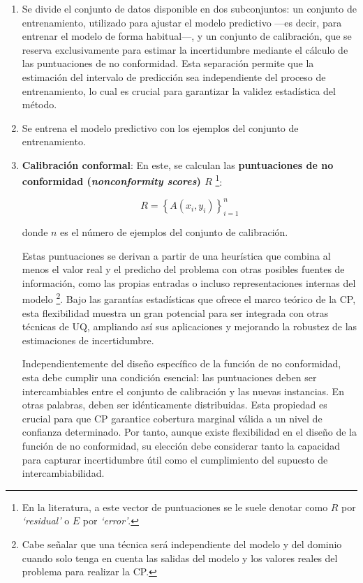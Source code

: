 \begin{enumerate}

    \item Se divide el conjunto de datos disponible en dos subconjuntos: un conjunto de entrenamiento, utilizado para ajustar el modelo predictivo ---es decir, para entrenar el modelo de forma habitual---, y un conjunto de calibración, que se reserva exclusivamente para estimar la incertidumbre mediante el cálculo de las puntuaciones de no conformidad. Esta separación permite que la estimación del intervalo de predicción sea independiente del proceso de entrenamiento, lo cual es crucial para garantizar la validez estadística del método.

    \item Se entrena el modelo predictivo con los ejemplos del conjunto de entrenamiento. 

    \item \textbf{Calibración conformal}: En este, se calculan las \textbf{puntuaciones de no conformidad (\textit{nonconformity scores}) $R$}%
    \footnote{
        En la literatura, a este vector de puntuaciones se le suele denotar como $R$ por \textit{`residual'}
        o $E$ por \textit{`error'}. 
    }:

    $$
    R = \left\{ A(x_i,y_i) \right\}_{i=1}^n
    $$

    donde $n$ es el número de ejemplos del conjunto de calibración.

    Estas puntuaciones se derivan a partir de una heurística que combina al menos el valor real y el predicho del problema con otras posibles fuentes de información, como las propias entradas o incluso representaciones internas del modelo%
    \footnote{
        Cabe señalar que una técnica será independiente del modelo y del dominio cuando solo tenga en cuenta las salidas del modelo y los valores reales del problema para realizar la \acrshort{CP}.
    }. 
    Bajo las garantías estadísticas que ofrece el marco teórico de la \acrshort{CP}, esta flexibilidad muestra un gran potencial para ser integrada con otras técnicas de \acrshort{UQ}, ampliando así sus aplicaciones y mejorando la robustez de las estimaciones de incertidumbre.

    Independientemente del diseño específico de la función de no conformidad, esta debe cumplir una condición esencial: las puntuaciones deben ser intercambiables entre el conjunto de calibración y las nuevas instancias. En otras palabras, deben ser idénticamente distribuidas. Esta propiedad es crucial para que \acrshort{CP} garantice cobertura marginal válida a un nivel de confianza determinado. Por tanto, aunque existe flexibilidad en el diseño de la función de no conformidad, su elección debe considerar tanto la capacidad para capturar incertidumbre útil como el cumplimiento del supuesto de intercambiabilidad. 


\end{enumerate}
